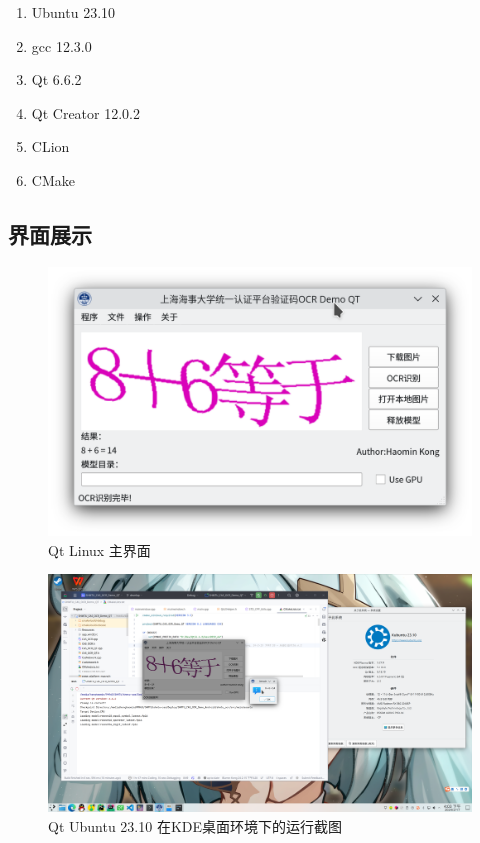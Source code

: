 \begin{enumerate}
	\item Ubuntu 23.10
	\item gcc 12.3.0
	\item Qt 6.6.2
	\item Qt Creator 12.0.2
	\item CLion
	\item CMake
\end{enumerate}

\subsection{界面展示}

\begin{figure}
	\centering
	\includegraphics[width=0.9\linewidth]{Resources/Picture/Deploy/Qt/Linux/qt_linux_main}
	\caption{Qt Linux 主界面}
	\label{fig:qtlinuxmain}
\end{figure}

\begin{figure}
	\centering
	\includegraphics[width=0.9\linewidth]{Resources/Picture/Deploy/Qt/Linux/linux}
	\caption{Qt Ubuntu 23.10 在KDE桌面环境下的运行截图}
	\label{fig:linux}
\end{figure}

